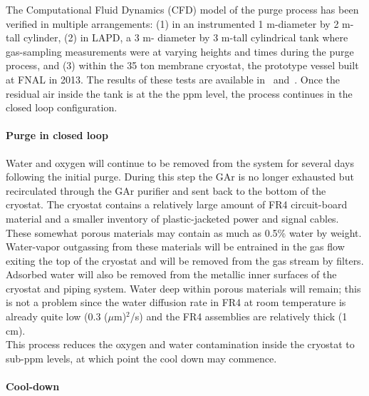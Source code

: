 The Computational Fluid Dynamics (CFD) model of the purge process has been verified in multiple arrangements: (1) in an instrumented 1 m-diameter by 2 m-tall cylinder, (2) in LAPD, a 3 m- diameter by 3 m-tall cylindrical tank where gas-sampling measurements were at varying heights and times during the purge process, and (3) within the 35 ton membrane cryostat, the prototype vessel built at FNAL in 2013. The results of these tests are available in~\cite{lar1-nd-35-ton-talk} and~\cite{CFD_verification-lapd}. 
%
Once the residual air inside the tank is at the the ppm level, the process continues in the closed loop configuration. 

\paragraph{Purge in closed loop}

Water and oxygen will continue to be removed from the system for several days following the initial purge. During this step the GAr is no longer exhausted but recirculated through the GAr purifier and sent back to the bottom of the cryostat. The cryostat contains a relatively large amount of FR4 circuit-board material and a smaller inventory of plastic-jacketed power and signal cables. These somewhat porous materials may contain as much as 0.5\% water by weight. Water-vapor outgassing from these materials will be entrained in the gas flow exiting the top of the cryostat and will be removed from the gas stream by filters. Adsorbed water will also be removed from the metallic inner surfaces of the cryostat and piping system. Water deep within porous materials will remain; this is not a problem since the water diffusion rate in FR4 at room temperature is already quite low (0.3 ($\mu$m)$^2$/s) and the FR4 assemblies are relatively thick (1 cm).\\
%
This process reduces the oxygen and water contamination inside the cryostat to sub-ppm levels, at which point the cool down may commence.

\paragraph{Cool-down}

